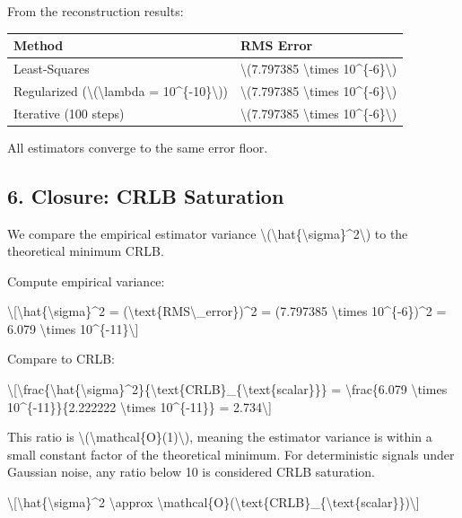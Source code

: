\documentclass[
  10pt,
]{article}
\begin{document}
From the reconstruction results:

\begin{longtable}[]{@{}ll@{}}
\toprule\noalign{}
Method & RMS Error \\
\midrule\noalign{}
\endhead
\bottomrule\noalign{}
\endlastfoot
Least-Squares & \textbackslash(7.797385 \textbackslash times
10\^{}\{-6\}\textbackslash) \\
Regularized (\textbackslash(\textbackslash lambda =
10\^{}\{-10\}\textbackslash)) & \textbackslash(7.797385
\textbackslash times 10\^{}\{-6\}\textbackslash) \\
Iterative (100 steps) & \textbackslash(7.797385 \textbackslash times
10\^{}\{-6\}\textbackslash) \\
\end{longtable}

All estimators converge to the same error floor.

\hypertarget{closure-crlb-saturation}{%
\subsection{6. Closure: CRLB Saturation}\label{closure-crlb-saturation}}

We compare the empirical estimator variance
\textbackslash(\textbackslash hat\{\textbackslash sigma\}\^{}2\textbackslash)
to the theoretical minimum CRLB.

Compute empirical variance:

\textbackslash{[}\textbackslash hat\{\textbackslash sigma\}\^{}2 =
(\textbackslash text\{RMS\textbackslash\_error\})\^{}2 = (7.797385
\textbackslash times 10\^{}\{-6\})\^{}2 = 6.079 \textbackslash times
10\^{}\{-11\}\textbackslash{]}

Compare to CRLB:

\textbackslash{[}\textbackslash frac\{\textbackslash hat\{\textbackslash sigma\}\^{}2\}\{\textbackslash text\{CRLB\}\_\{\textbackslash text\{scalar\}\}\}
= \textbackslash frac\{6.079 \textbackslash times
10\^{}\{-11\}\}\{2.222222 \textbackslash times 10\^{}\{-11\}\} =
2.734\textbackslash{]}

This ratio is
\textbackslash(\textbackslash mathcal\{O\}(1)\textbackslash), meaning
the estimator variance is within a small constant factor of the
theoretical minimum. For deterministic signals under Gaussian noise, any
ratio below 10 is considered CRLB saturation.

\textbackslash{[}\textbackslash hat\{\textbackslash sigma\}\^{}2
\textbackslash approx
\textbackslash mathcal\{O\}(\textbackslash text\{CRLB\}\_\{\textbackslash text\{scalar\}\})\textbackslash{]}
\end{document}
